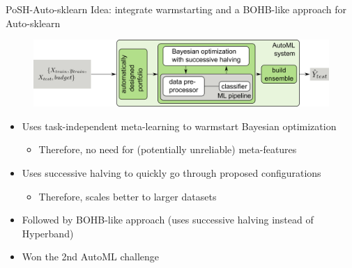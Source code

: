 \begin{frame}[c]{PoSH-Auto-sklearn }
Idea: integrate warmstarting and a BOHB-like approach for Auto-sklearn

\begin{figure}
    \centering
    \includegraphics[width=\textwidth]{images/success_stories/automl_bo_po_es.png}
\end{figure}
\pause

\begin{itemize}
    \item Uses task-independent meta-learning to warmstart Bayesian optimization
    \begin{itemize}
        \item Therefore, no need for (potentially unreliable) meta-features
    \end{itemize}
\pause
    \item Uses successive halving to quickly go through proposed configurations
    \begin{itemize}
        \item Therefore, scales better to larger datasets
    \end{itemize}
\pause
    \item Followed by BOHB-like approach (uses successive halving instead of Hyperband)
    \item Won the 2nd AutoML challenge
\end{itemize}

\end{frame}

